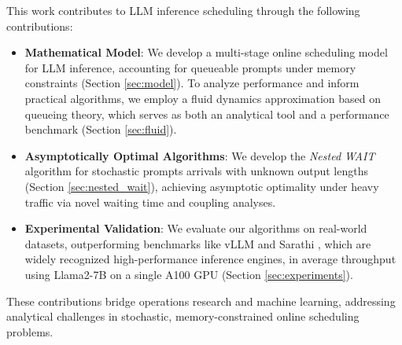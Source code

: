 This work contributes to LLM inference scheduling through the following contributions:
\begin{itemize}
\item \textbf{Mathematical Model}: We develop a multi-stage online scheduling model for LLM inference, accounting for queueable prompts under memory constraints (Section \ref{sec:model}). To analyze performance and inform practical algorithms, we employ a fluid dynamics approximation based on queueing theory, which serves as both an analytical tool and a performance benchmark (Section \ref{sec:fluid}).
    \item \textbf{Asymptotically Optimal Algorithms}: We develop the \textit{Nested WAIT} algorithm for stochastic prompts arrivals with unknown output lengths (Section \ref{sec:nested_wait}), achieving asymptotic optimality under heavy traffic via novel waiting time and coupling analyses. 
    \item \textbf{Experimental Validation}: We evaluate our algorithms on real-world datasets, outperforming benchmarks like vLLM \citep{kwon2023efficient} and Sarathi \citep{agrawal2023sarathi}, which are widely recognized high-performance inference engines, in average throughput using Llama2-7B on a single A100 GPU (Section \ref{sec:experiments}).
\end{itemize}
These contributions bridge operations research and machine learning, addressing analytical challenges in stochastic, memory-constrained online scheduling problems.

